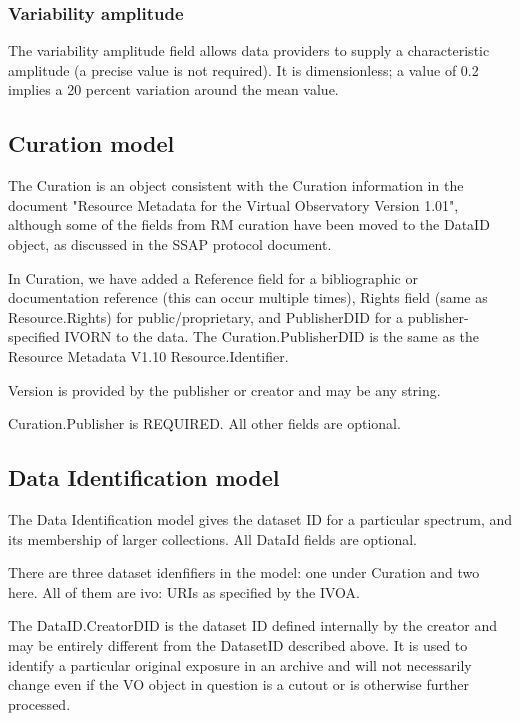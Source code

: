 \documentclass[11pt]{article}
\begin{document}
\subsubsection{Variability amplitude}

The variability amplitude field allows data providers to supply
a characteristic amplitude (a precise value is not required).
It is dimensionless; a value of 0.2 implies a 20 percent variation
around the mean value.



\subsection{Curation model}

The Curation is an object consistent with the Curation information in
the document "Resource Metadata for the Virtual Observatory Version
1.01",
although some of the fields from RM curation have been moved to the DataID
object, as discussed in the SSAP protocol document.


In Curation, we have added a Reference field for a bibliographic or documentation
reference (this can occur multiple times), Rights field (same as Resource.Rights)
for public/proprietary, and PublisherDID
for a publisher-specified IVORN to the data. The Curation.PublisherDID
is the same as the Resource Metadata V1.10 Resource.Identifier.

Version is provided by the publisher or creator and may be any string.
 
Curation.Publisher is REQUIRED. All other
fields are optional.  


\subsection{Data Identification model}


The Data Identification model gives the dataset ID for a particular
spectrum, and its membership of larger collections.
All DataId fields are optional. 

There are three dataset idenfifiers in the model: one under Curation
and two here. All of them are ivo: URIs
as specified by the IVOA.
 
The DataID.CreatorDID is the dataset ID defined internally by
the creator and may be entirely different from the DatasetID described
above. It is used to identify a particular original exposure in an archive
and will not necessarily change even if the VO object in question is a cutout or
is otherwise further processed.
\end{document}
